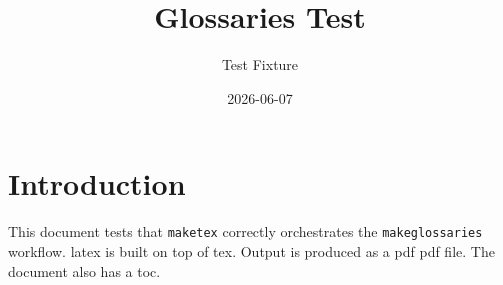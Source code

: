 \documentclass{article}
\title{Glossaries Test}
\author{Test Fixture}
\date{2026-06-07}
\begin{document}
\maketitle

\section{Introduction}
This document tests that \texttt{maketex} correctly orchestrates the
\texttt{makeglossaries} workflow. \Gls{latex} is built on top of \gls{tex}.
Output is produced as a \gls{pdf} \gls{pdf} file. The document also has a
\gls{toc}.

\printglossaries
\end{document}
